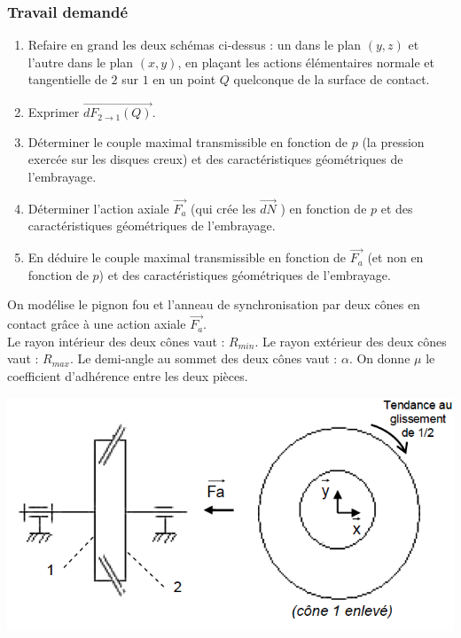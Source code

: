 \subsubsection{Travail demandé}
\begin{enumerate}
\item Refaire en grand les deux schémas ci-dessus : un dans le plan $(y, z)$ et l’autre dans le plan $(x, y)$, en plaçant les actions élémentaires normale et tangentielle de $2$ sur $1$ en un point $Q$ quelconque de la surface de contact.
\item Exprimer $\overrightarrow{dF_{2\rightarrow1}(Q)}$.
\item Déterminer le couple maximal transmissible en fonction de $p$ (la pression exercée sur les disques creux) et des caractéristiques géométriques de l’embrayage.
\item Déterminer l’action axiale $\overrightarrow{F_a}$ (qui crée les $\overrightarrow{dN}$ ) en fonction de $p$ et des caractéristiques géométriques de l’embrayage.
\item En déduire le couple maximal transmissible en fonction de $\overrightarrow{F_a}$ (et non en fonction de $p$) et des caractéristiques géométriques de l’embrayage.
\end{enumerate}

\newpage



On modélise le pignon fou et l'anneau de synchronisation par deux cônes en contact grâce à une action axiale $\overrightarrow{F_a}$.\\
Le rayon intérieur des deux cônes vaut : $R_{min}$. Le rayon extérieur des deux cônes vaut : $R_{max}$. Le demi-angle au sommet des deux cônes vaut : $\alpha$. On donne $\mu$ le coefficient d’adhérence entre
les deux pièces.

\begin{center}
\includegraphics[scale=0.5]{png/embrayage2.png}
\end{center}

